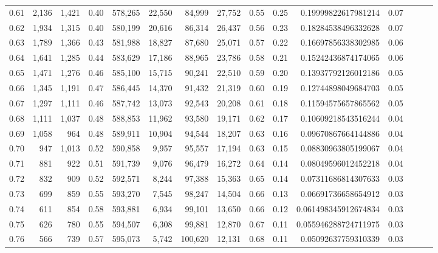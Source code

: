 \begin{tabular}{rrrrrrrrrrrrrrr}
0.61 &   2,136 &  1,421 &  0.40 &  578,265 &   22,550 &   84,999 &   27,752 &  0.55 &  0.25 &   0.19999822617981214 &      0.07 \\
0.62 &   1,934 &  1,315 &  0.40 &  580,199 &   20,616 &   86,314 &   26,437 &  0.56 &  0.23 &   0.18284538496332628 &      0.07 \\
0.63 &   1,789 &  1,366 &  0.43 &  581,988 &   18,827 &   87,680 &   25,071 &  0.57 &  0.22 &   0.16697856338302985 &      0.06 \\
0.64 &   1,641 &  1,285 &  0.44 &  583,629 &   17,186 &   88,965 &   23,786 &  0.58 &  0.21 &   0.15242436874174065 &      0.06 \\
0.65 &   1,471 &  1,276 &  0.46 &  585,100 &   15,715 &   90,241 &   22,510 &  0.59 &  0.20 &   0.13937792126012186 &      0.05 \\
0.66 &   1,345 &  1,191 &  0.47 &  586,445 &   14,370 &   91,432 &   21,319 &  0.60 &  0.19 &   0.12744898049684703 &      0.05 \\
0.67 &   1,297 &  1,111 &  0.46 &  587,742 &   13,073 &   92,543 &   20,208 &  0.61 &  0.18 &   0.11594575657865562 &      0.05 \\
0.68 &   1,111 &  1,037 &  0.48 &  588,853 &   11,962 &   93,580 &   19,171 &  0.62 &  0.17 &   0.10609218543516244 &      0.04 \\
0.69 &   1,058 &    964 &  0.48 &  589,911 &   10,904 &   94,544 &   18,207 &  0.63 &  0.16 &   0.09670867664144886 &      0.04 \\
0.70 &     947 &  1,013 &  0.52 &  590,858 &    9,957 &   95,557 &   17,194 &  0.63 &  0.15 &   0.08830963805199067 &      0.04 \\
0.71 &     881 &    922 &  0.51 &  591,739 &    9,076 &   96,479 &   16,272 &  0.64 &  0.14 &   0.08049596012452218 &      0.04 \\
0.72 &     832 &    909 &  0.52 &  592,571 &    8,244 &   97,388 &   15,363 &  0.65 &  0.14 &   0.07311686814307633 &      0.03 \\
0.73 &     699 &    859 &  0.55 &  593,270 &    7,545 &   98,247 &   14,504 &  0.66 &  0.13 &   0.06691736658654912 &      0.03 \\
0.74 &     611 &    854 &  0.58 &  593,881 &    6,934 &   99,101 &   13,650 &  0.66 &  0.12 &  0.061498345912674834 &      0.03 \\
0.75 &     626 &    780 &  0.55 &  594,507 &    6,308 &   99,881 &   12,870 &  0.67 &  0.11 &  0.055946288724711975 &      0.03 \\
0.76 &     566 &    739 &  0.57 &  595,073 &    5,742 &  100,620 &   12,131 &  0.68 &  0.11 &   0.05092637759310339 &      0.03 \\

\end{tabular}

